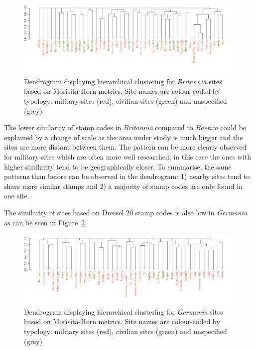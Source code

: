 \begin{figure}[htp]
	\centering
\includegraphics[angle=270,
width=0.7\linewidth]{dendrobrit5.pdf}
\caption{Dendrogram displaying hierarchical clustering for \textit{Britannia} sites based on Morisita-Horn metrics. Site names are colour-coded by typology: military sites (red), civilian sites (green) and unspecified (grey)}
\label{britmap}
\end{figure}

The lower similarity of stamp codes in \textit{Britannia} compared to \textit{Baetica} could be explained by a change of scale as the area under study is much bigger and the sites are more distant between them. The pattern can be more clearly observed for military sites which are often more well researched; in this case the ones with higher similarity tend to be geographically closer. To summarise, the same patterns than before can be observed in the dendrogram: 1) nearby sites tend to share more similar stamps and 2) a majority of stamp codes are only found in one site.
 
The similarity of sites based on Dressel 20 stamp codes is also low in \textit{Germania} as can be seen in Figure~\ref{germap}. 

\begin{figure}
	\centering
\includegraphics[angle=270, width=0.7\linewidth]{dendroger5.pdf}
\caption{Dendrogram displaying hierarchical clustering for \textit{Germania} sites based on Morisita-Horn metrics. Site names are colour-coded by typology: military sites (red), civilian sites (green) and unspecified (grey)}
\label{germap}
\end{figure}

